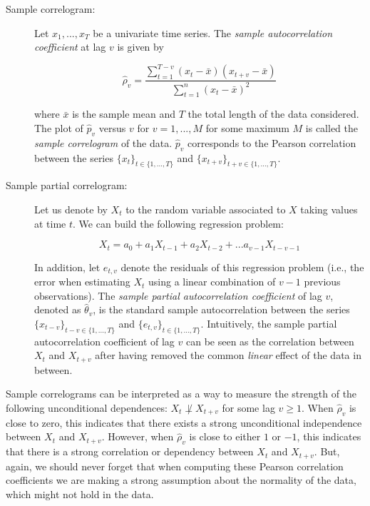 \begin{description}
\item[Sample correlogram:] Let ${x_1,...,x_T}$ be a univariate time series. The \emph{sample autocorrelation coefficient} at lag $v$ is given by 

$$ \hat{\rho}_v =\frac{\sum_{t=1}^{T-v} (x_t-\bar{x})(x_{t+v}-\bar{x})}{\sum_{t=1}^{n} (x_t-\bar{x})^2}$$ 

\noindent where $\bar{x}$ is the sample mean and $T$ the total length of the data considered. The plot of $\hat{p}_v$ versus $v$ for $v=1,..., M$ for some maximum $M$ is called the \emph{sample correlogram} of the data. $\hat{p}_v$ corresponds to the Pearson correlation between the series $\{x_t\}_{t\in\{1,...,T\}}$ and $\{x_{t+v}\}_{t+v\in\{1,...,T\}}$.

\item[Sample partial correlogram:] Let us denote by $X_t$ to the random variable associated to $X$ taking values at time $t$. We can build the following regression problem:

$$ X_t = a_0 + a_1X_{t-1} + a_2X_{t-2} + ... a_{v-1}X_{t-v-1}$$

In addition, let $e_{t,v}$ denote the residuals of this regression problem (i.e., the error when estimating $X_t$ using a linear combination of $v-1$ previous observations). The \emph{sample partial autocorrelation coefficient} of lag $v$, denoted as  $\hat{\theta}_v$, is the standard sample autocorrelation between the series $\{x_{t-v}\}_{t-v\in\{1,...,T\}}$ and $\{e_{t,v}\}_{t\in\{1,...,T\}}$. Intuitively, the sample partial autocorrelation coefficient of lag $v$ can be seen as the correlation between $X_t$ and $X_{t+v}$ after having removed the common \emph{linear} effect of the data in between.
\end{description}

Sample correlograms can be interpreted as a way to measure the strength of the following unconditional dependences: $X_t  \not\perp X_{t+v}$ for some lag $v \geq 1$.  When $\hat{\rho}_v$ is close to zero, this indicates that there exists a strong unconditional independence between $X_t$ and $X_{t+v}$. However, when $\hat{\rho}_v$ is close to either $1$ or $-1$, this indicates that there is a strong correlation or dependency between $X_t$ and $X_{t+v}$. But, again, we should never forget that when computing these Pearson correlation coefficients we are making a strong assumption about the normality of the data, which might not hold in the data.

